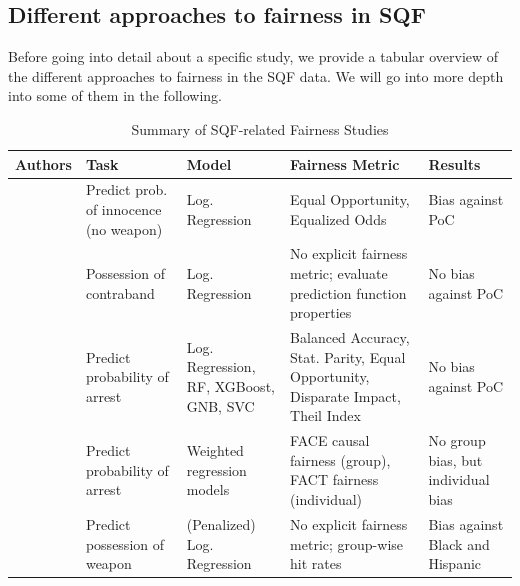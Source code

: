 



\subsection{Different approaches to fairness in SQF}

Before going into detail about a specific study, we provide a tabular overview of the different approaches to fairness in the SQF data. We will go into more depth into some of them in the following.

\begin{table}[h]
    \centering
        \begin{tabular}{|m{2cm}|m{3cm}|m{2.5cm}|m{3.5cm}|m{3cm}|}
            \hline
            \textbf{Authors} & \textbf{Task} & \textbf{Model} & \textbf{Fairness Metric} & \textbf{Results} \\
            \hline
            \cite{kallus2018} 
            & Predict prob. of innocence (no weapon) 
            & Log. Regression 
            & Equal Opportunity, Equalized Odds 
            & Bias against PoC \\ 
            \hline
            \cite{RambachanBBOEFW} 
            & Possession of contraband
            & Log. Regression 
            & No explicit fairness metric; evaluate prediction function properties 
            & No bias against PoC\\
            \hline
            \cite{Badr2022DTFANSP} 
            & Predict probability of arrest 
            & Log. Regression, RF, XGBoost, GNB, SVC 
            & Balanced Accuracy, Stat. Parity, Equal Opportunity, Disparate Impact, Theil Index 
            & No bias against PoC \\ 
            \hline
            \cite{Khademi2019FADMELC} 
            & Predict probability of arrest 
            & Weighted regression models
            & FACE causal fairness (group), FACT fairness (individual) 
            & No group bias, but individual bias \\ 
            \hline
            \cite{goel2016} 
            & Predict possession of weapon 
            & (Penalized) Log. Regression 
            & No explicit fairness metric; group-wise hit rates 
            & Bias against Black and Hispanic\\ 
            \hline
        \end{tabular}
        \caption{Summary of SQF-related Fairness Studies}
        \label{tab:sqf_summary}
\end{table}

